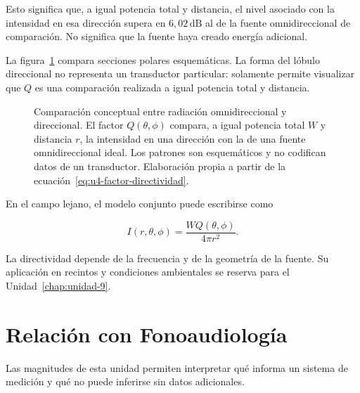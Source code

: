 Esto significa que, a igual potencia total y distancia, el nivel asociado con
la intensidad en esa dirección supera en \(6{,}02\,\text{dB}\) al de la
fuente omnidireccional de comparación. No significa que la fuente haya creado
energía adicional.

La figura~\ref{fig:u4-directividad-q} compara secciones polares esquemáticas.
La forma del lóbulo direccional no representa un transductor particular:
solamente permite visualizar que \(Q\) es una comparación realizada a igual
potencia total y distancia.

\begin{figure}[htbp]
    \centering
    
    \caption{Comparación conceptual entre radiación omnidireccional y
    direccional. El factor \(Q(\theta,\phi)\) compara, a igual potencia total
    \(W\) y distancia \(r\), la intensidad en una dirección con la de una
    fuente omnidireccional ideal. Los patrones son esquemáticos y no codifican
    datos de un transductor. Elaboración propia a partir de la
    ecuación~\eqref{eq:u4-factor-directividad}.}
    \label{fig:u4-directividad-q}
\end{figure}

En el campo lejano, el modelo conjunto puede escribirse como

\begin{equation}
    I(r,\theta,\phi)
      =\frac{WQ(\theta,\phi)}{4\pi r^2}.
    \label{eq:u4-intensidad-directividad}
\end{equation}

La directividad depende de la frecuencia y de la geometría de la fuente. Su
aplicación en recintos y condiciones ambientales se reserva para el
Unidad~\ref{chap:unidad-9}.

\section{Relación con Fonoaudiología}
\label{sec:u4-fonoaudiologia}

Las magnitudes de esta unidad permiten interpretar qué informa un sistema de
medición y qué no puede inferirse sin datos adicionales.

